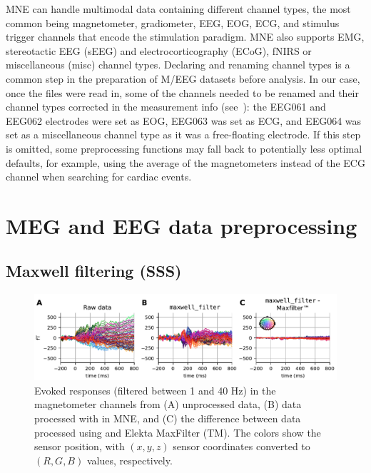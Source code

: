 MNE can handle multimodal data containing different channel types, the most common being magnetometer, gradiometer, \ac{EEG}, \ac{EOG}, \ac{ECG}, and stimulus trigger channels that encode the stimulation paradigm. MNE also supports \ac{EMG}, stereotactic EEG (sEEG) and electrocorticography (ECoG), \ac{fNIRS} or miscellaneous (misc) channel types. Declaring and renaming channel types is a common step in the preparation of M/EEG datasets before analysis. In our case, once the files were read in, some of the channels needed to be renamed and their channel types corrected in the measurement info (see~\citep{wakeman2015multi}): the EEG061 and EEG062 electrodes were set as EOG, EEG063 was set as ECG, and EEG064 was set as a miscellaneous channel type as it was a free-floating electrode. If this step is omitted, some preprocessing functions may fall back to potentially less optimal defaults, for example, using the average of the magnetometers instead of the ECG channel when searching for cardiac events.

\section{MEG and EEG data preprocessing}

\subsection{Maxwell filtering (SSS)}
\label{sec:maxfilter}

\begin{figure}[htb]
        \centering
        \includegraphics[width=\linewidth]{figures/Maxfilter.pdf}
        \caption[Comparison of Elekta MaxFilter (TM) and MNE implementation]{Evoked responses (filtered between 1 and 40 Hz) in the magnetometer channels from (A) unprocessed data, (B) data processed with  in MNE, and (C) the difference between data processed using  and Elekta MaxFilter (TM). The colors show the sensor position, with $(x, y, z)$ sensor coordinates converted to $(R, G, B)$ values, respectively.}
        \label{fig:fig_maxwell}
\end{figure}

